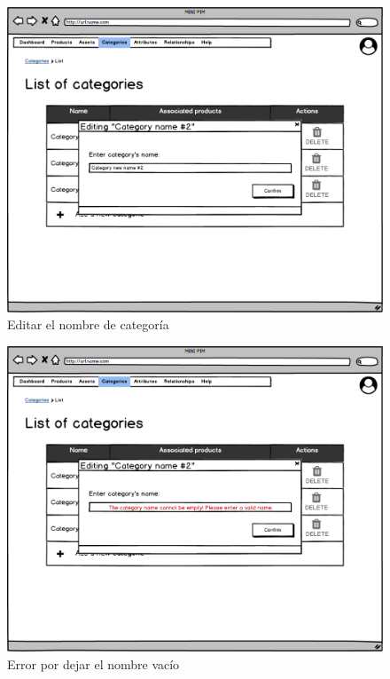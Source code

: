\vspace{0.20cm}

\begin{figure}[H]
    \includegraphics[width=1\linewidth]{mockups/RF4.3_1.png}
    \caption{Editar el nombre de categoría}
   \end{figure}
\vspace{1.0cm}

\begin{figure}[H]
    \includegraphics[width=1\linewidth]{mockups/RF4.3_2.png}
    \caption{Error por dejar el nombre vacío}
   \end{figure}
\vspace{1.0cm}

